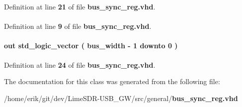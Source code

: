 Definition at line {\bf 21} of file {\bf bus\+\_\+sync\+\_\+reg.\+vhd}.

\paragraph[{std\+\_\+logic\+\_\+1164}]{\hspace{0.3cm}{\ttfamily [Package]}}\label{classbus__sync__reg_acd03516902501cd1c7296a98e22c6fcb}


Definition at line {\bf 9} of file {\bf bus\+\_\+sync\+\_\+reg.\+vhd}.

\paragraph[{sync\+\_\+out}]{ {\bfseries \textcolor{keywordflow}{out}\textcolor{vhdlchar}{ }} {\bfseries \textcolor{comment}{std\+\_\+logic\+\_\+vector}\textcolor{vhdlchar}{ }\textcolor{vhdlchar}{(}\textcolor{vhdlchar}{ }\textcolor{vhdlchar}{ }\textcolor{vhdlchar}{ }\textcolor{vhdlchar}{ }{\bfseries {\bf bus\+\_\+width}} \textcolor{vhdlchar}{-\/}\textcolor{vhdlchar}{ } \textcolor{vhdldigit}{1} \textcolor{vhdlchar}{ }\textcolor{keywordflow}{downto}\textcolor{vhdlchar}{ }\textcolor{vhdlchar}{ } \textcolor{vhdldigit}{0} \textcolor{vhdlchar}{ }\textcolor{vhdlchar}{)}\textcolor{vhdlchar}{ }} \hspace{0.3cm}{\ttfamily [Port]}}\label{classbus__sync__reg_a35cf023b155fcc4ea3f6102d1387104c}


Definition at line {\bf 24} of file {\bf bus\+\_\+sync\+\_\+reg.\+vhd}.



The documentation for this class was generated from the following file\+:\begin{DoxyCompactItemize}
\item 
/home/erik/git/dev/\+Lime\+S\+D\+R-\/\+U\+S\+B\+\_\+\+G\+W/src/general/{\bf bus\+\_\+sync\+\_\+reg.\+vhd}\end{DoxyCompactItemize}
